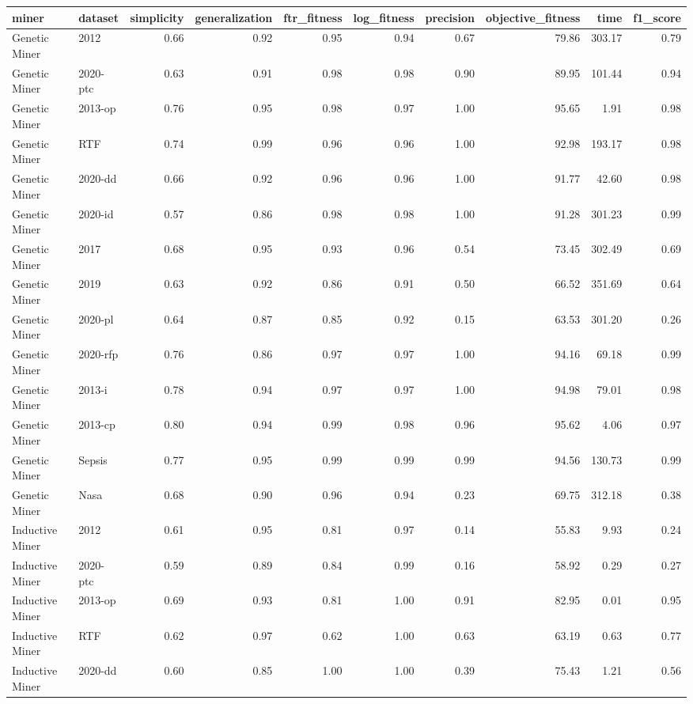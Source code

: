 \begin{tabular}{llrrrrrrrr}
\toprule
miner & dataset & simplicity & generalization & ftr_fitness & log_fitness & precision & objective_fitness & time & f1_score \\
\midrule
Genetic Miner & 2012 & 0.66 & 0.92 & 0.95 & 0.94 & 0.67 & 79.86 & 303.17 & 0.79 \\
Genetic Miner & 2020-ptc & 0.63 & 0.91 & 0.98 & 0.98 & 0.90 & 89.95 & 101.44 & 0.94 \\
Genetic Miner & 2013-op & 0.76 & 0.95 & 0.98 & 0.97 & 1.00 & 95.65 & 1.91 & 0.98 \\
Genetic Miner & RTF & 0.74 & 0.99 & 0.96 & 0.96 & 1.00 & 92.98 & 193.17 & 0.98 \\
Genetic Miner & 2020-dd & 0.66 & 0.92 & 0.96 & 0.96 & 1.00 & 91.77 & 42.60 & 0.98 \\
Genetic Miner & 2020-id & 0.57 & 0.86 & 0.98 & 0.98 & 1.00 & 91.28 & 301.23 & 0.99 \\
Genetic Miner & 2017 & 0.68 & 0.95 & 0.93 & 0.96 & 0.54 & 73.45 & 302.49 & 0.69 \\
Genetic Miner & 2019 & 0.63 & 0.92 & 0.86 & 0.91 & 0.50 & 66.52 & 351.69 & 0.64 \\
Genetic Miner & 2020-pl & 0.64 & 0.87 & 0.85 & 0.92 & 0.15 & 63.53 & 301.20 & 0.26 \\
Genetic Miner & 2020-rfp & 0.76 & 0.86 & 0.97 & 0.97 & 1.00 & 94.16 & 69.18 & 0.99 \\
Genetic Miner & 2013-i & 0.78 & 0.94 & 0.97 & 0.97 & 1.00 & 94.98 & 79.01 & 0.98 \\
Genetic Miner & 2013-cp & 0.80 & 0.94 & 0.99 & 0.98 & 0.96 & 95.62 & 4.06 & 0.97 \\
Genetic Miner & Sepsis & 0.77 & 0.95 & 0.99 & 0.99 & 0.99 & 94.56 & 130.73 & 0.99 \\
Genetic Miner & Nasa & 0.68 & 0.90 & 0.96 & 0.94 & 0.23 & 69.75 & 312.18 & 0.38 \\
Inductive Miner & 2012 & 0.61 & 0.95 & 0.81 & 0.97 & 0.14 & 55.83 & 9.93 & 0.24 \\
Inductive Miner & 2020-ptc & 0.59 & 0.89 & 0.84 & 0.99 & 0.16 & 58.92 & 0.29 & 0.27 \\
Inductive Miner & 2013-op & 0.69 & 0.93 & 0.81 & 1.00 & 0.91 & 82.95 & 0.01 & 0.95 \\
Inductive Miner & RTF & 0.62 & 0.97 & 0.62 & 1.00 & 0.63 & 63.19 & 0.63 & 0.77 \\
Inductive Miner & 2020-dd & 0.60 & 0.85 & 1.00 & 1.00 & 0.39 & 75.43 & 1.21 & 0.56 \\

\end{tabular}
